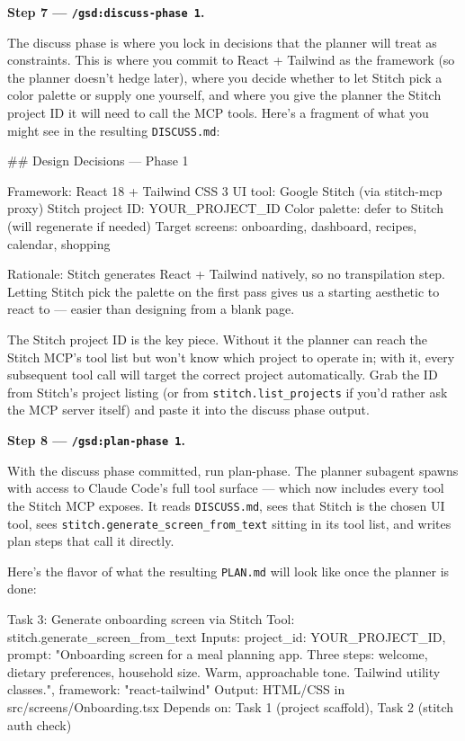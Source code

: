\documentclass[11pt,letterpaper,openany]{book}
\begin{document}
\begin{gsdscenario}
\vspace{6pt}
\textbf{Step 7 --- \texttt{/gsd:discuss-phase 1}.}
\vspace{4pt}

The discuss phase is where you lock in decisions that the planner
will treat as constraints. This is where you commit to React +
Tailwind as the framework (so the planner doesn't hedge later), where
you decide whether to let Stitch pick a color palette or supply one
yourself, and where you give the planner the Stitch project ID it
will need to call the MCP tools. Here's a fragment of what you
might see in the resulting \texttt{DISCUSS.md}:

\begin{gsdyaml}
## Design Decisions --- Phase 1

Framework: React 18 + Tailwind CSS 3
UI tool: Google Stitch (via stitch-mcp proxy)
Stitch project ID: YOUR_PROJECT_ID
Color palette: defer to Stitch (will regenerate if needed)
Target screens: onboarding, dashboard, recipes, calendar, shopping

Rationale: Stitch generates React + Tailwind natively, so no
transpilation step. Letting Stitch pick the palette on the first
pass gives us a starting aesthetic to react to --- easier than
designing from a blank page.
\end{gsdyaml}

The Stitch project ID is the key piece. Without it the planner can
reach the Stitch MCP's tool list but won't know which project to
operate in; with it, every subsequent tool call will target the
correct project automatically. Grab the ID from Stitch's project
listing (or from \texttt{stitch.list\_projects} if you'd rather ask
the MCP server itself) and paste it into the discuss phase output.

\vspace{6pt}
\textbf{Step 8 --- \texttt{/gsd:plan-phase 1}.}
\vspace{4pt}

With the discuss phase committed, run plan-phase. The planner
subagent spawns with access to Claude Code's full tool surface ---
which now includes every tool the Stitch MCP exposes. It reads
\texttt{DISCUSS.md}, sees that Stitch is the chosen UI tool, sees
\texttt{stitch.generate\_screen\_from\_text} sitting in its tool
list, and writes plan steps that call it directly.

Here's the flavor of what the resulting \texttt{PLAN.md} will look
like once the planner is done:

\begin{gsdplain}
Task 3: Generate onboarding screen via Stitch
  Tool:   stitch.generate_screen_from_text
  Inputs: {
    project_id: YOUR_PROJECT_ID,
    prompt:     "Onboarding screen for a meal planning app. Three
                 steps: welcome, dietary preferences, household size.
                 Warm, approachable tone. Tailwind utility classes.",
    framework:  "react-tailwind"
  }
  Output: HTML/CSS in src/screens/Onboarding.tsx
  Depends on: Task 1 (project scaffold), Task 2 (stitch auth check)
\end{gsdplain}


\end{gsdscenario}
\end{document}
